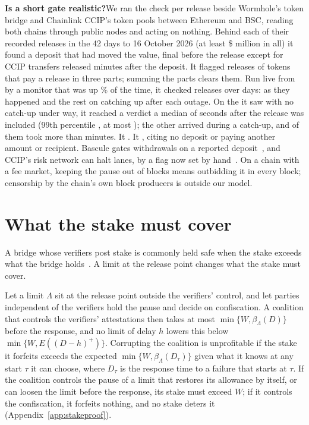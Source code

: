 \documentclass[conference,compsoc]{IEEEtran}
\numberwithin{equation}{section}
\theoremstyle{plain}
\theoremstyle{definition}
\theoremstyle{remark}
\newcommand{\runinq}[1]{\par\smallskip\noindent\textbf{#1}\enspace}
\begin{document}
\runinq{Is a short gate realistic?}We ran the check per release beside Wormhole's token bridge and Chainlink CCIP's token pools between Ethereum and BSC, reading both chains through public nodes and acting on nothing. Behind each of their \shRel{} recorded releases in the 42 days to 16 October 2026 (at least \$\shUsdM{} million in all) it found a deposit that had moved the value, final before the release except for \shNotFinal{} CCIP transfers released \shNotFinalAgeMin{} minutes after the deposit. It flagged \shUnmatched{} releases of \shFeeTokens{} tokens that pay a release in three parts; summing the parts clears them. Run live from \shLiveStart{} by a monitor that was up \shLiveUpPct\% of the time, it checked \shLiveAll{} releases over \shLiveDays{} days: \shLiveN{} as they happened and the rest on catching up after each outage. On the \shLiveCaughtN{} it saw with no catch-up under way, it reached a verdict a median of \shLiveMedS{} seconds after the release was included (99th percentile \shLiveNinetyNineS{}, at most \shLiveMaxS{}); the other \shLiveWaitedN{} arrived during a catch-up, and \shLiveWaitedOver{} of them took more than \pbGateMin{} minutes. It \shLiveAlarmText{}. It \shTwinText{}, citing no deposit or paying another amount or recipient. Bascule gates withdrawals on a reported deposit~\cite{cubist2024bascule}, and CCIP's risk network can halt lanes, by a flag now set by hand~\cite{chainlink2023rmn,chainlink_ccip_architecture}. On a chain with a fee market, keeping the pause out of blocks means outbidding it in every block; censorship by the chain's own block producers is outside our model.

\section{What the stake must cover}\label{sec:stake}

A bridge whose verifiers post stake is commonly held safe when the stake exceeds what the bridge holds~\cite{augusto2024sok}. A limit at the release point changes what the stake must cover.

Let a limit $\Lambda$ sit at the release point outside the verifiers' control, and let parties independent of the verifiers hold the pause and decide on confiscation. A coalition that controls the verifiers' attestations then takes at most $\min\{W, \beta_\Lambda(D)\}$ before the response, and no limit of delay $h$ lowers this below $\min\{W, E((D-h)^+)\}$. Corrupting the coalition is unprofitable if the stake it forfeits exceeds the expected $\min\{W, \beta_\Lambda(D_\tau)\}$ given what it knows at any start $\tau$ it can choose, where $D_\tau$ is the response time to a failure that starts at $\tau$. If the coalition controls the pause of a limit that restores its allowance by itself, or can loosen the limit before the response, its stake must exceed $W$; if it controls the confiscation, it forfeits nothing, and no stake deters it (Appendix~\ref{app:stakeproof}).
\end{document}
